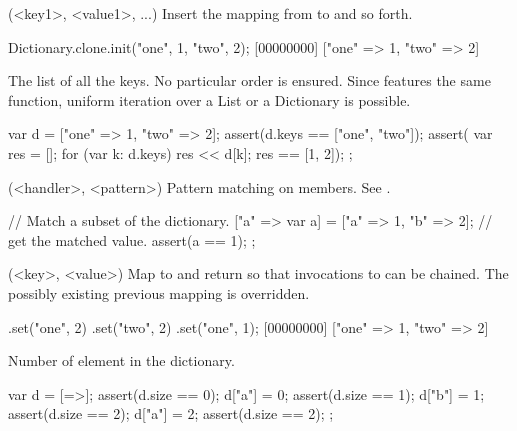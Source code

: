 \begin{urbiscriptapi}
\item[init](<key1>, <value1>, ...)%
  Insert the mapping from  to  and so forth.

\begin{urbiscript}
Dictionary.clone.init("one", 1, "two", 2);
[00000000] ["one" => 1, "two" => 2]
\end{urbiscript}


\item[keys]%
  The list of all the keys.  No particular order is ensured.  Since
   features the same function, uniform iteration over
  a List or a Dictionary is possible.
\begin{urbiscript}
{
  var d = ["one" => 1, "two" => 2];
  assert(d.keys == ["one", "two"]);
  assert({
           var res = [];
           for (var k: d.keys)
             res << d[k];
           res
         }
         == [1, 2]);
};
\end{urbiscript}


\item[matchAgainst](<handler>, <pattern>)
  Pattern matching on members.  See .

\begin{urbiscript}
{
  // Match a subset of the dictionary.
  ["a" => var a] = ["a" => 1, "b" => 2];
  // get the matched value.
  assert(a == 1);
};
\end{urbiscript}


\item[set](<key>, <value>)%
  Map  to  and return \this so that invocations to
   can be chained.  The possibly existing previous mapping is
  overridden.

\begin{urbiscript}
[=>].set("one", 2)
    .set("two", 2)
    .set("one", 1);
[00000000] ["one" => 1, "two" => 2]
\end{urbiscript}


\item[size]
  Number of element in the dictionary.

\begin{urbiscript}
{
  var d = [=>];
  assert(d.size == 0);
  d["a"] = 0;
  assert(d.size == 1);
  d["b"] = 1;
  assert(d.size == 2);
  d["a"] = 2;
  assert(d.size == 2);
};
\end{urbiscript}



\end{urbiscriptapi}


